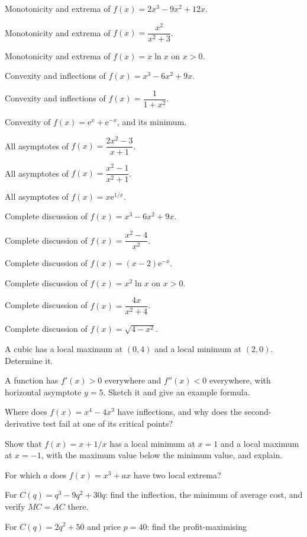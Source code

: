 \begin{problems}
  \item Monotonicity and extrema of $f(x)=2x^{3}-9x^{2}+12x$.
  \item Monotonicity and extrema of $f(x)=\dfrac{x^{2}}{x^{2}+3}$.
  \item Monotonicity and extrema of $f(x)=x\ln x$ on $x>0$.
  \item Convexity and inflections of $f(x)=x^{3}-6x^{2}+9x$.
  \item Convexity and inflections of $f(x)=\dfrac{1}{1+x^{2}}$.
  \item Convexity of $f(x)=\mathrm{e}^{x}+\mathrm{e}^{-x}$, and its
        minimum.
  \item All asymptotes of $f(x)=\dfrac{2x^{2}-3}{x+1}$.
  \item All asymptotes of $f(x)=\dfrac{x^{2}-1}{x^{2}+1}$.
  \item All asymptotes of $f(x)=x\mathrm{e}^{1/x}$.
  \item Complete discussion of $f(x)=x^{3}-6x^{2}+9x$.
  \item Complete discussion of $f(x)=\dfrac{x^{2}-4}{x^{2}}$.
  \item Complete discussion of $f(x)=(x-2)\mathrm{e}^{-x}$.
  \item Complete discussion of $f(x)=x^{2}\ln x$ on $x>0$.
  \item Complete discussion of $f(x)=\dfrac{4x}{x^{2}+4}$.
  \item Complete discussion of $f(x)=\sqrt{4-x^{2}}$.
  \item A cubic has a local maximum at $(0,4)$ and a local minimum at
        $(2,0)$. Determine it.
  \item A function has $f'(x)>0$ everywhere and $f''(x)<0$ everywhere, with
        horizontal asymptote $y=5$. Sketch it and give an example formula.
  \item Where does $f(x)=x^{4}-4x^{3}$ have inflections, and why does the
        second-derivative test fail at one of its critical points?
  \item Show that $f(x)=x+1/x$ has a local minimum at $x=1$ and a local
        maximum at $x=-1$, with the maximum value below the minimum value,
        and explain.
  \item For which $a$ does $f(x)=x^{3}+ax$ have two local extrema?
  \item For $C(q)=q^{3}-9q^{2}+30q$: find the inflection, the minimum of
        average cost, and verify $MC=AC$ there.
  \item For $C(q)=2q^{2}+50$ and price $p=40$: find the profit-maximising

\end{problems}
